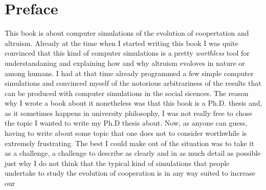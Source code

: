 
\chapter{Preface}

This book is about computer simulations of the evolution of coopertation and altruism. 
Already at the time when I started writing this book I was quite convinced that
this kind of computer simulations is a pretty {\em worthless} tool for understandaning
and explaining how and why altruism evoloves in nature or among humans. I had at that time already programmed a few simple computer simulations and convinced myself of the notorious arbitrariness of the results that can be produced with computer simulations in the social sicences. The reason why I wrote
a book about it nonetheless was that this book is a Ph.D. thesis and, as it sometimes happens in university philosophy, I was not really free to chose the topic I wanted to write my Ph.D thesis about. Now, as anyone can guess, having to write about some topic that one does not to consider worthwhile is extremely frustrating. The best
I could make out of the situation was to take it as a challenge, a challenge to describe as clearly and in
as much detail as possible just why I do not think that the typical kind of simulations that 
people undertake to study the evolution of cooperation is in any way suited to increase our 

